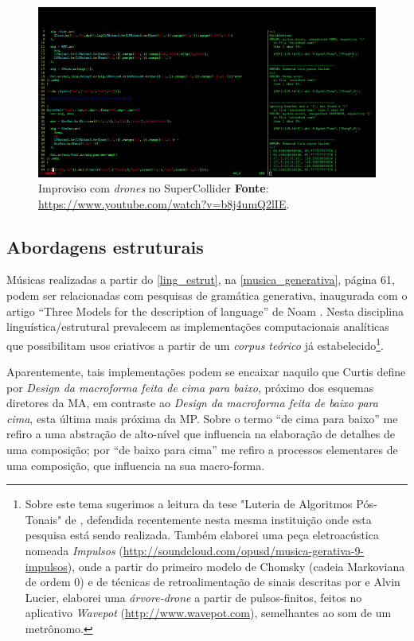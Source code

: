 \begin{figure}
\begin{center}
\includegraphics[scale=0.5]{./imagens/sc_drone.png}
\caption{Improviso com \emph{drones} no SuperCollider \textbf{Fonte}: \url{https://www.youtube.com/watch?v=b8j4umQ2lIE}. }
\label{sc_drone}
\end{center}
\end{figure}

\subsection{Abordagens estruturais}\label{abordagem estrutural}

Músicas realizadas a partir do \autoref{ling_estrut}, na \autoref{musica_generativa}, página 61, podem ser relacionadas com pesquisas de gramática generativa, inaugurada com o artigo ``Three Models for the description of language'' de Noam . Nesta disciplina linguística/estrutural prevalecem as implementações computacionais analíticas que possibilitam usos criativos a partir de um \textit{corpus teórico} já estabelecido\footnote{Sobre este tema sugerimos a leitura da tese "Luteria de Algoritmos Pós-Tonais" de , defendida recentemente nesta mesma instituição onde esta pesquisa está sendo realizada. Também elaborei uma peça eletroacústica nomeada \textit{Impulsos} (\url{http://soundcloud.com/opusd/musica-gerativa-9-impulsos}), onde a partir do primeiro modelo de Chomsky (cadeia Markoviana de ordem 0) e de técnicas de retroalimentação de sinais descritas por  e Alvin Lucier, elaborei uma \textit{árvore-drone} a partir de pulsos-finitos, feitos no aplicativo \emph{Wavepot} (\url{http://www.wavepot.com}), semelhantes ao som de um metrônomo.}.


Aparentemente, tais implementações podem se encaixar naquilo que Curtis  define por \textit{Design da macroforma feita de cima para baixo}, próximo dos esquemas diretores da MA,  em contraste ao \textit{Design da macroforma feita de baixo para cima}, esta última mais próxima da MP. Sobre o termo ``de cima para baixo'' me refiro a uma abstração de alto-nível que influencia na elaboração de detalhes de uma composição; por ``de baixo para cima'' me refiro a processos elementares de uma composição, que influencia na sua macro-forma.

